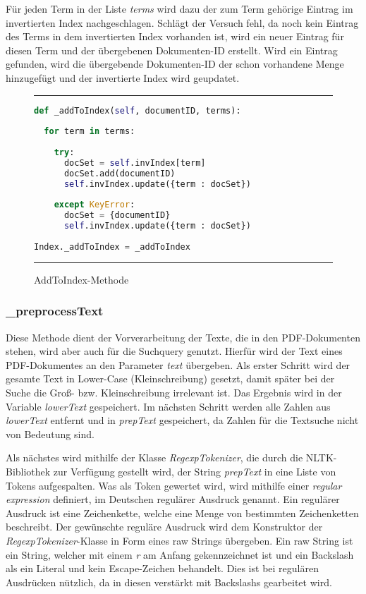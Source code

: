 Für jeden Term in der Liste \emph{terms} wird dazu der zum Term gehörige Eintrag im invertierten Index nachgeschlagen. Schlägt der Versuch fehl, da noch kein Eintrag des Terms in dem invertierten Index vorhanden ist, wird ein neuer Eintrag für diesen Term und der übergebenen Dokumenten-ID erstellt. Wird ein Eintrag gefunden, wird die übergebende Dokumenten-ID der schon vorhandene Menge hinzugefügt und der invertierte Index wird geupdatet.

\begin{figure}
	\rule{\textwidth}{0.4pt}
		\begin{lstlisting}[language=Python]
def _addToIndex(self, documentID, terms):
    
  for term in terms:
        
    try:
      docSet = self.invIndex[term]
      docSet.add(documentID)
      self.invIndex.update({term : docSet})
            
    except KeyError:
      docSet = {documentID}
      self.invIndex.update({term : docSet})
    
Index._addToIndex = _addToIndex
		\end{lstlisting}
	\rule{\textwidth}{0.4pt}
	\caption{AddToIndex-Methode}
	\label{fig:addToIndex}
\end{figure}

\subsubsection{\_preprocessText}\label{preprocess}
Diese Methode dient der Vorverarbeitung der Texte, die in den PDF-Dokumenten stehen, wird aber auch für die Suchquery genutzt. Hierfür wird der Text eines PDF-Dokumentes an den Parameter \textit{text} übergeben. Als erster Schritt wird der gesamte Text in Lower-Case (Kleinschreibung) gesetzt, damit später bei der Suche die Groß- bzw. Kleinschreibung irrelevant ist. Das Ergebnis wird in der Variable \textit{lowerText} gespeichert. Im nächsten Schritt werden alle Zahlen aus \textit{lowerText} entfernt und in \textit{prepText} gespeichert, da Zahlen für die Textsuche nicht von Bedeutung sind.

Als nächstes wird mithilfe der Klasse \textit{RegexpTokenizer}, die durch die NLTK-Bibliothek zur Verfügung gestellt wird, der String \textit{prepText} in eine Liste von Tokens aufgespalten. Was als Token gewertet wird, wird mithilfe einer \textit{regular expression} definiert, im Deutschen regulärer Ausdruck genannt. Ein regulärer Ausdruck ist eine Zeichenkette, welche eine Menge von bestimmten Zeichenketten beschreibt. Der gewünschte reguläre Ausdruck wird dem Konstruktor der \textit{RegexpTokenizer}-Klasse in Form eines raw Strings übergeben. Ein raw String ist ein String, welcher mit einem \textit{r} am Anfang gekennzeichnet ist und ein Backslash als ein Literal und kein Escape-Zeichen behandelt. Dies ist bei regulären Ausdrücken nützlich, da in diesen verstärkt mit Backslashs gearbeitet wird.

